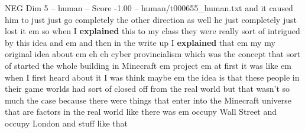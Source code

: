 \begin{textsample}{NEG Dim 5 – human – Score -1.00 – human/t000655\_human.txt}  \label{ex:f5_neg_033}
and it caused him to just just go completely the other direction as well he just completely just lost it em so when I \textbf{explained} this to my class they were really sort of intrigued by this idea and em and then in the write up I \textbf{explained} that em my my original idea about em eh eh cyber provincialism which was the concept that sort of started the whole building in Minecraft em project em at first it was like em when I first heard about it I was think maybe em the idea is that these people in their game worlds had sort of closed off from the real world but that wasn't so much the case because there were things that enter into the Minecraft universe that are factors in the real world like there was em occupy Wall Street and occupy London and stuff like that

\end{textsample}
